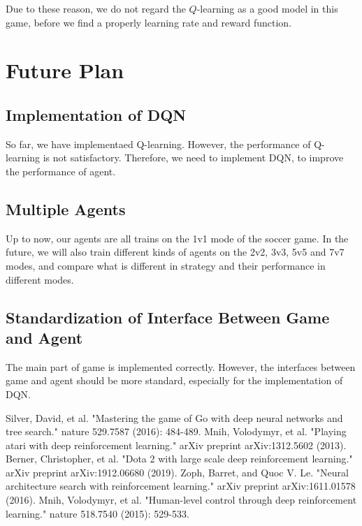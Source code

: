 \documentclass[14pt]{extarticle}
\begin{document}
Due to these reason, we do not regard the $Q$-learning as a good model in this game, before we find a properly learning rate and reward function.

\section{Future Plan}

\subsection{Implementation of DQN}
So far, we have implementaed Q-learning. However, the performance of Q-learning is not satisfactory. Therefore, we need to implement DQN, to improve the performance of agent.

\subsection{Multiple Agents}
Up to now, our agents are all trains on the 1v1 mode of the soccer game. In the future, we will also train different kinds of agents on the 2v2, 3v3, 5v5 and 7v7 modes, and compare what is different in strategy and their performance in different modes.

\subsection{Standardization of Interface Between Game and Agent}
The main part of game is implemented correctly. However, the interfaces between game and agent should be more standard, especially for the implementation of DQN.



\begin{thebibliography}{99}
	Silver, David, et al. "Mastering the game of Go with deep neural networks and tree search." nature 529.7587 (2016): 484-489.
	Mnih, Volodymyr, et al. "Playing atari with deep reinforcement learning." arXiv preprint arXiv:1312.5602 (2013).
	Berner, Christopher, et al. "Dota 2 with large scale deep reinforcement learning." arXiv preprint arXiv:1912.06680 (2019).
    Zoph, Barret, and Quoc V. Le. "Neural architecture search with reinforcement learning." arXiv preprint arXiv:1611.01578 (2016).
    Mnih, Volodymyr, et al. "Human-level control through deep reinforcement learning." nature 518.7540 (2015): 529-533.
\end{thebibliography}
\end{document}

